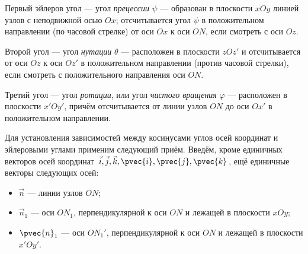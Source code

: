 Первый эйлеров угол --- угол \textit{прецессии} $\psi$ --- образован в плоскости
$xOy$ линией узлов с неподвижной осью $Ox$; отсчитывается угол $\psi$ в
положительном направлении (по часовой стрелке) от оси $Ox$ к оси $ON$, если
смотреть с оси $Oz$.

Второй угол --- угол \textit{нутации} $\theta$ --- расположен в плоскости $zOz'$
и отсчитывается от оси $Oz$ к оси $Oz'$ в положительном направлении (против
часовой стрелки), если смотреть с положительного направления оси $ON$.

Третий угол --- угол \textit{ротации}, или угол \textit{чистого вращения}
$\varphi$ --- расположен в плоскости $x'Oy'$, причём отсчитывается от линии
узлов $ON$ до оси $Ox'$ в положительном направлении.

\begin{figure}[H]
  \centering

  \caption{}
  \label{fig:19_2}
\end{figure}

Для установления зависимостей между косинусами углов осей координат и эйлеровыми
углами применим следующий приём. Введём, кроме единичных векторов осей координат
$\vec{i}, \vec{j}, \vec{k}, \pvec{i}, \pvec{j}, \pvec{k}$, ещё единичные векторы
следующих осей:
\begin{itemize}
  \item $\vec{n}$ --- линии узлов $ON$;
  \item $\vec{n}_1$ --- оси $ON_1$, перпендикулярной к оси $ON$ и лежащей в
    плоскости $xOy$;
  \item $\pvec{n}_1$ --- оси $ON_1'$, перпендикулярной к оси $ON$ и лежащей в
    плоскости $x'Oy'$.
\end{itemize}

